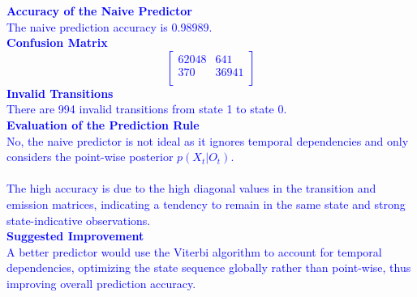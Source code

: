 \documentclass[a4 paper]{article}
\begin{document}
\begin{enumerate}
\textcolor{blue}{  
    \textbf{Accuracy of the Naive Predictor} \\
    The naive prediction accuracy is 0.98989. \\
    \textbf{Confusion Matrix} \\
    \[
    \begin{bmatrix}
        62048 & 641 \\
        370 & 36941 \\
    \end{bmatrix}
    \]
    \textbf{Invalid Transitions} \\
    There are 994 invalid transitions from state 1 to state 0. \\
    \textbf{Evaluation of the Prediction Rule} \\
     No, the naive predictor is not ideal as it ignores temporal dependencies and only considers the point-wise posterior \( p(X_t | O_t) \). \\
     \\
    The high accuracy is due to the high diagonal values in the transition and emission matrices, indicating a tendency to remain in the same state and strong state-indicative observations. \\
    \textbf{Suggested Improvement} \\
    A better predictor would use the Viterbi algorithm to account for temporal dependencies, optimizing the state sequence globally rather than point-wise, thus improving overall prediction accuracy.
}

\end{enumerate}
\end{document}
